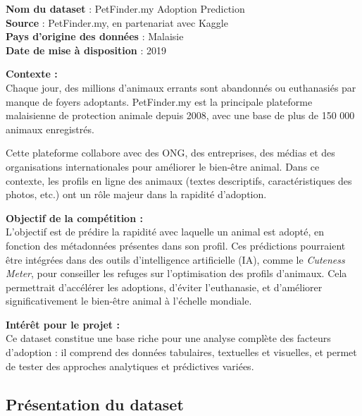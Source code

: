 \documentclass[a4paper,12pt]{article}
\begin{document}
\bigskip

\textbf{Nom du dataset} : PetFinder.my Adoption Prediction \\
\textbf{Source} : PetFinder.my, en partenariat avec Kaggle \\
\textbf{Pays d’origine des données} : Malaisie \\
\textbf{Date de mise à disposition} : 2019

\medskip

\noindent
\textbf{Contexte :} \\
Chaque jour, des millions d’animaux errants sont abandonnés ou euthanasiés par manque de foyers adoptants. PetFinder.my est la principale plateforme malaisienne de protection animale depuis 2008, avec une base de plus de 150 000 animaux enregistrés.

Cette plateforme collabore avec des ONG, des entreprises, des médias et des organisations internationales pour améliorer le bien-être animal. Dans ce contexte, les profils en ligne des animaux (textes descriptifs, caractéristiques des photos, etc.) ont un rôle majeur dans la rapidité d’adoption.

\medskip

\noindent
\textbf{Objectif de la compétition :} \\
L’objectif est de prédire la rapidité avec laquelle un animal est adopté, en fonction des métadonnées présentes dans son profil. Ces prédictions pourraient être intégrées dans des outils d’intelligence artificielle (IA), comme le \textit{Cuteness Meter}, pour conseiller les refuges sur l’optimisation des profils d’animaux. Cela permettrait d’accélérer les adoptions, d’éviter l’euthanasie, et d’améliorer significativement le bien-être animal à l’échelle mondiale.

\medskip

\noindent
\textbf{Intérêt pour le projet :} \\
Ce dataset constitue une base riche pour une analyse complète des facteurs d’adoption : il comprend des données tabulaires, textuelles et visuelles, et permet de tester des approches analytiques et prédictives variées.

\subsection {Présentation du dataset}
\end{document}
